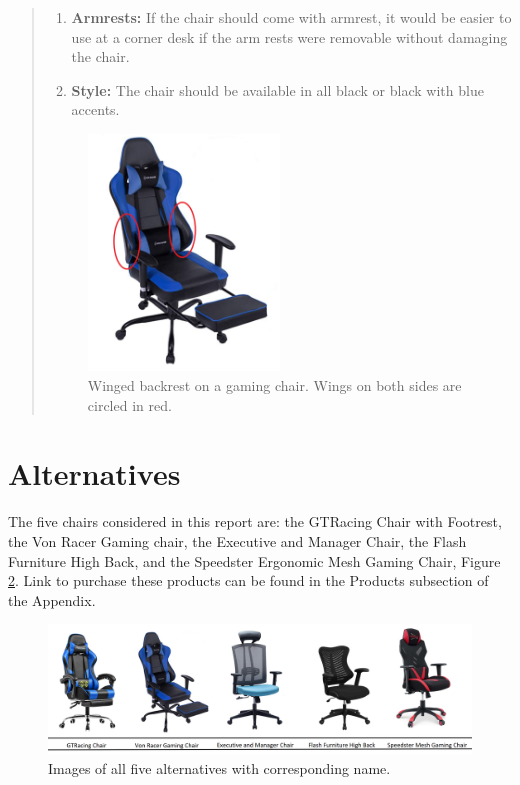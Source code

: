 \documentclass[11pt]{article}
\begin{document}
\begin{quote}
\begin{enumerate}
            \item \textbf{Armrests:} If the chair should come with armrest, it would be easier to use at a corner desk if the arm rests were removable without damaging the chair.
            \item \textbf{Style:} The chair should be available in all black or black with blue accents. 
        \end{enumerate}
        \begin{figure}
            \begin{center}
                \includegraphics[width = 2in]{Winglets.PNG}
            \end{center}   
            \caption{Winged backrest on a gaming chair. Wings on both sides are circled in red.}
            \label{fig:Wings}              
        \end{figure}   
    \end{quote}

    \section{Alternatives}
    
    The five chairs considered in this report are: the GTRacing Chair with Footrest, the Von Racer Gaming chair, the Executive and Manager Chair, the Flash Furniture High Back, and the Speedster Ergonomic Mesh Gaming Chair, Figure \ref{fig:chairs}. Link to purchase these products can be found in the Products subsection of the Appendix. 

    \begin{figure}[H]
        \includegraphics[width=6in]{chairDiagram.PNG}
        \caption{Images of all five alternatives with corresponding name.}
        \label{fig:chairs}
    \end{figure}
    
\end{document}
